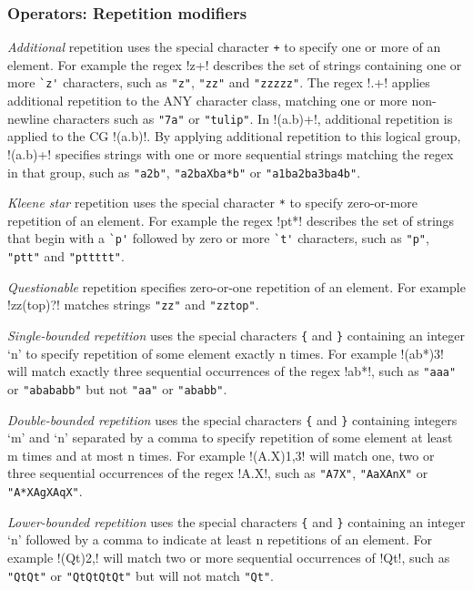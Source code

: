 \subsubsection{Operators: Repetition modifiers}
\begin{description} \itemsep -1pt
\item[ADD:] \emph{Additional} repetition uses the special character \verb!+! to specify one or more of an element.  For example the regex \cverb!z+! describes the set of strings containing one or more \verb!`z'! characters, such as \verb!"z"!, \verb!"zz"! and \verb!"zzzzz"!.  The regex \cverb!.+! applies additional repetition to the ANY character class, matching one or more non-newline characters such as \verb!"7a"! or \verb!"tulip"!.  In \cverb!(a.b)+!, additional repetition is applied to the CG \cverb!(a.b)!.   By applying additional repetition to this logical group, \cverb!(a.b)+! specifies strings with one or more sequential strings matching the regex in that group, such as \verb!"a2b"!, \verb!"a2baXba*b"! or \verb!"a1ba2ba3ba4b"!.
\item[KLE:] \emph{Kleene star} repetition uses the special character \verb!*! to specify zero-or-more repetition of an element.  For example the regex \cverb!pt*! describes the set of strings that begin with a \verb!`p'! followed by zero or more \verb!`t'! characters, such as \verb!"p"!, \verb!"ptt"! and \verb!"pttttt"!.
\item[QST:] \emph{Questionable} repetition specifies zero-or-one repetition of an element.  For example \cverb!zz(top)?! matches strings \verb!"zz"! and \verb!"zztop"!.
\item[SNG:] \emph{Single-bounded repetition} uses the special characters \verb!{! and \verb!}! containing an integer `n' to specify repetition of some element exactly n times.  For example \cverb!(ab*){3}! will match exactly three sequential occurrences of the regex \cverb!ab*!, such as \verb!"aaa"! or \verb!"abababb"! but not \verb!"aa"! or \verb!"ababb"!.
\item[DBB:] \emph{Double-bounded repetition} uses the special characters \verb!{! and \verb!}! containing integers `m' and `n' separated by a comma to specify repetition of some element at least m times and at most n times.  For example \cverb!(A.X){1,3}! will match one, two or three sequential occurrences of the regex \cverb!A.X!, such as \verb!"A7X"!, \verb!"AaXAnX"! or \verb!"A*XAgXAqX"!.
\item[LWB:] \emph{Lower-bounded repetition} uses the special characters \verb!{! and \verb!}! containing an integer `n' followed by a comma to indicate at least n repetitions of an element.  For example \cverb!(Qt){2,}! will match two or more sequential occurrences of \cverb!Qt!, such as \verb!"QtQt"! or \verb!"QtQtQtQt"! but will not match \verb!"Qt"!.

\end{description}
